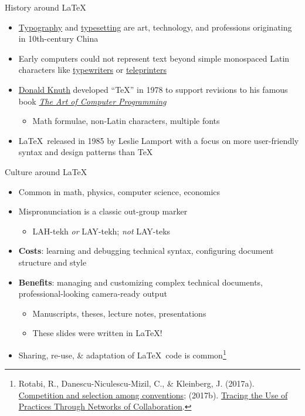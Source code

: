 \documentclass{cubeamer}
\begin{document}
\begin{frame}{History around \LaTeX}
    \begin{itemize}
        \item \href{https://en.wikipedia.org/wiki/Typography}{Typography} and \href{https://en.wikipedia.org/wiki/Typesetting}{typesetting} are art, technology, and professions originating in 10th-century China
        \item Early computers could not represent text beyond simple monospaced Latin characters like \href{https://en.wikipedia.org/wiki/Typewriter}{typewriters} or \href{https://en.wikipedia.org/wiki/Teleprinter}{teleprinters}
        \item \href{https://en.wikipedia.org/wiki/Donald_Knuth}{Donald Knuth} developed ``TeX'' in 1978 to support revisions to his famous book \href{https://en.wikipedia.org/wiki/The_Art_of_Computer_Programming}{\textit{The Art of Computer Programming}}
        \begin{itemize}
            \item Math formulae, non-Latin characters, multiple fonts
        \end{itemize}
        \item \LaTeX~released in 1985 by Leslie Lamport with a focus on more user-friendly syntax and design patterns than TeX
    \end{itemize}
\end{frame}

\begin{frame}{Culture around \LaTeX}
    \begin{itemize}
        \item Common in math, physics, computer science, economics
        \item Mispronunciation is a classic out-group marker
        \begin{itemize}
            \item  LAH-tekh \textit{or} LAY-tekh; \textit{not} LAY-teks
        \end{itemize}
        \item \textbf{Costs}: learning and debugging technical syntax, configuring document structure and style
        \item \textbf{Benefits}: managing and customizing complex technical documents, professional-looking camera-ready output
        \begin{itemize}
            \item Manuscripts, theses, lecture notes, presentations
            \item These slides were written in \LaTeX!
        \end{itemize}
        \item Sharing, re-use, \& adaptation of \LaTeX~code is common\footnote{Rotabi, R., Danescu-Niculescu-Mizil, C., \& Kleinberg, J. (2017a). \href{https://dl.acm.org/doi/abs/10.1145/3038912.3052652}{Competition and selection among conventions}; (2017b). \href{https://ojs.aaai.org/index.php/ICWSM/article/view/14870}{Tracing the Use of Practices Through Networks of Collaboration}.}
    \end{itemize}
\end{frame}
\end{document}
